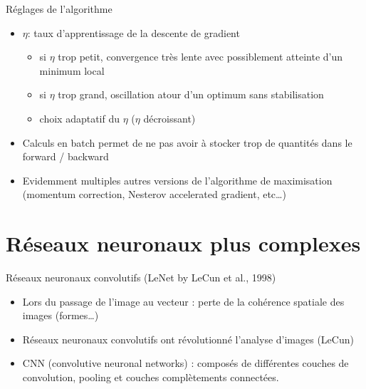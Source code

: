 \documentclass[ignorenonframetext,]{beamer}
\providecommand{\tightlist}{%
  \setlength{\itemsep}{0pt}\setlength{\parskip}{0pt}}
\begin{document}
\begin{frame}{Réglages de l'algorithme}

\begin{itemize}
\item
  \(\eta\): taux d'apprentissage de la descente de gradient

  \begin{itemize}
  \tightlist
  \item
    si \(\eta\) trop petit, convergence très lente avec possiblement
    atteinte d'un minimum local
  \item
    si \(\eta\) trop grand, oscillation atour d'un optimum sans
    stabilisation
  \item
    choix adaptatif du \(\eta\) (\(\eta\) décroissant)
  \end{itemize}
\item
  Calculs en batch permet de ne pas avoir à stocker trop de quantités
  dans le forward / backward
\item
  Evidemment multiples autres versions de l'algorithme de maximisation
  (momentum correction, Nesterov accelerated gradient, etc\ldots{})
\end{itemize}

\end{frame}

\section{Réseaux neuronaux plus
complexes}\label{reseaux-neuronaux-plus-complexes}

\begin{frame}{Réseaux neuronaux convolutifs (LeNet by LeCun et al.,
1998)}

\begin{itemize}
\item
  Lors du passage de l'image au vecteur : perte de la cohérence spatiale
  des images (formes\ldots{})
\item
  Réseaux neuronaux convolutifs ont révolutionné l'analyse d'images
  (LeCun)
\item
  CNN (convolutive neuronal networks) : composés de différentes couches
  de convolution, pooling et couches complètements connectées.
\end{itemize}

\end{frame}
\end{document}
